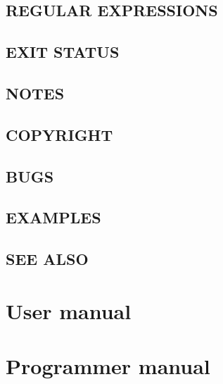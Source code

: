 \subsection*{REGULAR EXPRESSIONS}


\subsection*{EXIT STATUS}


\subsection*{NOTES}


\subsection*{COPYRIGHT}


\subsection*{BUGS}


\subsection*{EXAMPLES}


\subsection*{SEE ALSO}



\section{User manual}



\section{Programmer manual}


